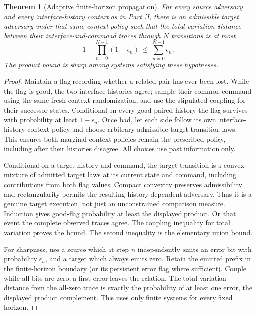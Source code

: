 \documentclass[11pt]{article}
\newtheorem{theorem}{Theorem}\newtheorem{proposition}{Proposition}\newtheorem{corollary}{Corollary}\newtheorem{definition}{Definition}
\begin{document}
\begin{theorem}[Adaptive finite-horizon propagation]
For every source adversary and every interface-history context as in Part II, there is an admissible target adversary under that same context policy such that the total variation distance between their interface-and-command traces through $N$ transitions is at most
\[
 1-\prod_{n=0}^{N-1}(1-\epsilon_n)\ \le\ \sum_{n=0}^{N-1}\epsilon_n.
\]
The product bound is sharp among systems satisfying these hypotheses.
\end{theorem}
\begin{proof}
Maintain a flag recording whether a related pair has ever been lost. While the flag is good, the two interface histories agree; sample their common command using the same fresh context randomization, and use the stipulated coupling for their successor states. Conditional on every good paired history the flag survives with probability at least $1-\epsilon_n$. Once bad, let each side follow its own interface-history context policy and choose arbitrary admissible target transition laws. This ensures both marginal context policies remain the prescribed policy, including after their histories disagree. All choices use past information only.

Conditional on a target history and command, the target transition is a convex mixture of admitted target laws at its current state and command, including contributions from both flag values. Compact convexity preserves admissibility and rectangularity permits the resulting history-dependent adversary. Thus it is a genuine target execution, not just an unconstrained comparison measure. Induction gives good-flag probability at least the displayed product. On that event the complete observed traces agree. The coupling inequality for total variation proves the bound. The second inequality is the elementary union bound.

For sharpness, use a source which at step $n$ independently emits an error bit with probability $\epsilon_n$, and a target which always emits zero. Retain the emitted prefix in the finite-horizon boundary (or its persistent error flag where sufficient). Couple while all bits are zero; a first error leaves the relation. The total variation distance from the all-zero trace is exactly the probability of at least one error, the displayed product complement. This uses only finite systems for every fixed horizon.
\end{proof}
\end{document}
